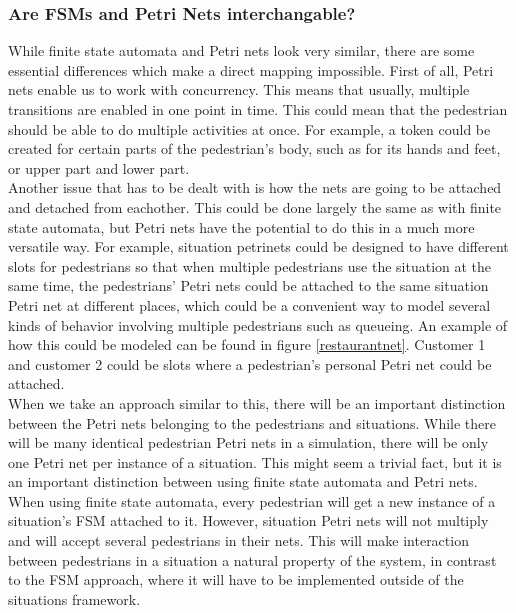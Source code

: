 \documentclass[11pt]{article}
\begin{document}
\subsubsection{Are FSMs and Petri Nets interchangable?}
While finite state automata and Petri nets look very similar, there are some essential differences which make a direct mapping impossible. First of all, Petri nets enable us to work with concurrency. This means that usually, multiple transitions are enabled in one point in time. This could mean that the pedestrian should be able to do multiple activities at once. For example, a token could be created for certain parts of the pedestrian's body, such as for its hands and feet, or upper part and lower part.\\
Another issue that has to be dealt with is how the nets are going to be attached and detached from eachother. This could be done largely the same as with finite state automata, but Petri nets have the potential to do this in a much more versatile way. For example, situation petrinets could be designed to have different slots for pedestrians so that when multiple pedestrians use the situation at the same time, the pedestrians' Petri nets could be attached to the same situation Petri net at different places, which could be a convenient way to model several kinds of behavior involving multiple pedestrians such as queueing. An example of how this could be modeled can be found in figure \ref{restaurantnet}.
Customer 1 and customer 2 could be slots where a pedestrian's personal Petri net could be attached. \\
When we take an approach similar to this, there will be an important distinction between the Petri nets belonging to the pedestrians and situations. While there will be many identical pedestrian Petri nets in a simulation, there will be only one Petri net per instance of a situation. This might seem a trivial fact, but it is an important distinction between using finite state automata and Petri nets. When using finite state automata, every pedestrian will get a new instance of a situation's FSM attached to it. However, situation Petri nets will not multiply and will accept several pedestrians in their nets. This will make interaction between pedestrians in a situation a natural property of the system, in contrast to the FSM approach, where it will have to be implemented outside of the situations framework.
\end{document}
